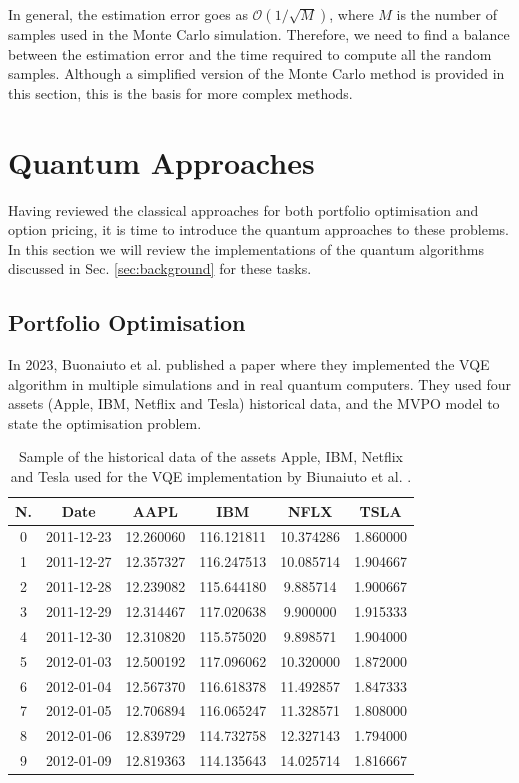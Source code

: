 \documentclass[prx,twocolumn,floatfix,superscriptaddress,longbibliography]{revtex4-1}
\begin{document}
In general, the estimation error goes as $\mathcal{O}(1/\sqrt{M})$, where $M$ is the number of samples used in the Monte Carlo simulation. Therefore, we need to find a balance between the estimation error and the time required to compute all the random samples. Although a simplified version of the Monte Carlo method is provided in this section, 
this is the basis for more complex methods. 

\section{Quantum Approaches}\label{sec:literature2}
Having reviewed the classical approaches for both portfolio optimisation and option pricing, it is time to 
introduce the quantum approaches to these problems. In this section we will review the implementations of the quantum algorithms discussed in Sec. \ref{sec:background} for these tasks.
\subsection{Portfolio Optimisation}
In 2023, Buonaiuto et al. \cite{Buonaiuto2023} published a paper where they implemented the VQE algorithm in multiple simulations and in real quantum computers. They used four assets (Apple, IBM, Netflix and Tesla) 
historical data, and the MVPO model to state the optimisation problem.

\begin{table}[h]
    \centering
     \caption{Sample of the historical data of the assets Apple, IBM, Netflix and Tesla used for the VQE implementation by Biunaiuto et al. \cite{Buonaiuto2023}.}
    \begin{tabular}{cccccc}
        \hline
        \textbf{N.} & \textbf{Date} & \textbf{AAPL} & \textbf{IBM} & \textbf{NFLX} & \textbf{TSLA} \\
        \midrule
        0  & 2011-12-23 & 12.260060 & 116.121811 & 10.374286 & 1.860000 \\
        1  & 2011-12-27 & 12.357327 & 116.247513 & 10.085714 & 1.904667 \\
        2  & 2011-12-28 & 12.239082 & 115.644180 & 9.885714 & 1.900667 \\
        3  & 2011-12-29 & 12.314467 & 117.020638 & 9.900000 & 1.915333 \\
        4  & 2011-12-30 & 12.310820 & 115.575020 & 9.898571 & 1.904000 \\
        5  & 2012-01-03 & 12.500192 & 117.096062 & 10.320000 & 1.872000 \\
        6  & 2012-01-04 & 12.567370 & 116.618378 & 11.492857 & 1.847333 \\
        7  & 2012-01-05 & 12.706894 & 116.065247 & 11.328571 & 1.808000 \\
        8  & 2012-01-06 & 12.839729 & 114.732758 & 12.327143 & 1.794000 \\
        9  & 2012-01-09 & 12.819363 & 114.135643 & 14.025714 & 1.816667 \\
        \hline
    \end{tabular} 
    \label{tab:stock_prices}
\end{table}
\end{document}
